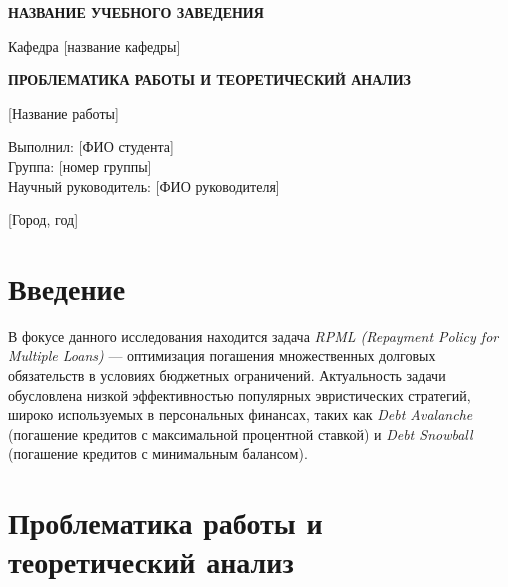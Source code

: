 \documentclass[12pt, a4paper]{report}
\begin{document}
\thispagestyle{empty}
\begin{center}
\vspace*{2cm}

{\Large \textbf{НАЗВАНИЕ УЧЕБНОГО ЗАВЕДЕНИЯ}}

\vspace{1cm}

{\large Кафедра [название кафедры]}

\vspace{3cm}

{\large \textbf{ПРОБЛЕМАТИКА РАБОТЫ И ТЕОРЕТИЧЕСКИЙ АНАЛИЗ}}

\vspace{1cm}

{\large [Название работы]}

\vspace{3cm}

\begin{flushright}
Выполнил: [ФИО студента] \\
Группа: [номер группы] \\
Научный руководитель: [ФИО руководителя]
\end{flushright}

\vspace{2cm}

{\large [Город, год]}

\end{center}

\newpage

\tableofcontents
\newpage

\setcounter{page}{3}

\section{Введение}

В фокусе данного исследования находится задача \textit{RPML (Repayment Policy for Multiple Loans)} — оптимизация погашения множественных долговых обязательств в условиях бюджетных ограничений. Актуальность задачи обусловлена низкой эффективностью популярных эвристических стратегий, широко используемых в персональных финансах, таких как \textit{Debt Avalanche} (погашение кредитов с максимальной процентной ставкой) и \textit{Debt Snowball} (погашение кредитов с минимальным балансом).

\section{Проблематика работы и теоретический анализ}
\end{document}
